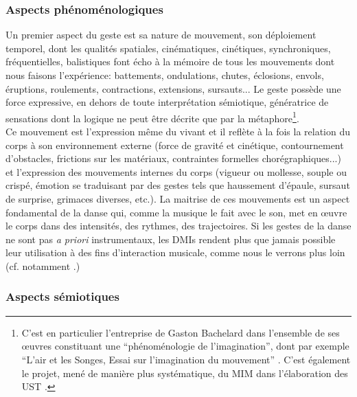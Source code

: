 \subsubsection{Aspects phénoménologiques}

\noindent Un premier aspect du geste est sa nature de mouvement, son déploiement temporel, dont les qualités spatiales, cinématiques, cinétiques, synchroniques, fréquentielles, balistiques font écho à la mémoire de tous les mouvements dont nous faisons l'expérience: battements, ondulations, chutes, éclosions, envols, éruptions, roulements, contractions, extensions, sursauts... Le geste possède une force expressive, en dehors de toute interprétation sémiotique, génératrice de sensations dont la logique ne peut être décrite que par la métaphore\footnote{C'est en particulier l'entreprise de Gaston Bachelard dans l'ensemble de ses œuvres constituant une ``phénoménologie de l'imagination'', dont par exemple ``L'air et les Songes, Essai sur l'imagination du mouvement'' \cite{bachelard_air_1943}. C'est également le projet, mené de manière plus systématique, du \gls{MIM} dans l'élaboration des \gls{UST} \cite{delalande_les_1996}.}.\\
\indent Ce mouvement est l'expression même du vivant et il reflète à la fois la relation du corps à son environnement externe (force de gravité et cinétique, contournement d'obstacles, frictions sur les matériaux, contraintes formelles chorégraphiques...) et l'expression des mouvements internes du corps (vigueur ou mollesse, souple ou crispé, émotion se traduisant par des gestes tels que haussement d'épaule, sursaut de surprise, grimaces diverses, etc.). La maitrise de ces mouvements est un aspect fondamental de la danse qui, comme la musique le fait avec le son, met en œuvre le corps dans des intensités, des rythmes, des trajectoires. Si les gestes de la danse ne sont pas \textit{a priori} instrumentaux, les \glspl{DMI} rendent plus que jamais possible leur utilisation à des fins d'interaction musicale, comme nous le verrons plus loin (cf. notamment \cite{bevilacqua_gesture_2011, alaoui_movement_2012, silang_maranan_designing_2014, hsueh_understanding_2019}.)

\subsubsection{Aspects sémiotiques}

